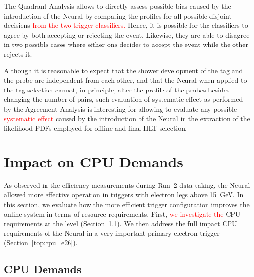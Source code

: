 The Quadrant Analysis allows to directly assess possible bias caused by the
introduction of the Neural\rnn{} by comparing the profiles for all possible disjoint
decisions \textcolor{red}{from the two trigger classifiers.} Hence, it is possible for the classifiers
to agree by both accepting or rejecting the event. Likewise, they are able to
disagree in two possible cases where either one decides to accept the event
while the other rejects it.

Although it is reasonable to expect that the shower development of the tag and
the probe are independent from each other, and that the Neural\rnn{} when applied to
the tag selection cannot, in principle, alter the profile of the probes besides
changing the number of \tnp{} pairs, such evaluation of systematic effect as
performed by the Agreement Analysis is interesting for allowing to evaluate any
possible \textcolor{red}{systematic effect} caused by the introduction of the Neural\rnn{} in the extraction of the
likelihood PDFs employed for offline and final HLT selection.

\FloatBarrier
\section{Impact on CPU Demands} %

As observed in the efficiency measurements during Run~2 data taking, the Neural\rnn{}
allowed more effective \fastcalo{} operation in triggers with electron legs
above \SI{15}{\GeV}. In this section, we evaluate how the more efficient trigger
configuration improves the online system in terms of resource requirements.
First, \textcolor{red}{we investigate the} CPU requirements at the \fastcalo{}
level (Section~\ref{top:fastcalo_cpu}). We then address the full impact CPU
requirements of the Neural\rnn{} in a very important primary electron trigger
(Section~\ref{top:cpu_e26}).

\subsection{\fastcalo{} CPU Demands}\label{top:fastcalo_cpu}


